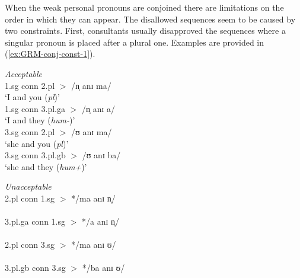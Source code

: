 

When the weak personal pronouns are conjoined there are limitations on the order
in which they can appear. The disallowed sequences seem to be caused by two
constraints. First, consultants usually disapproved   the sequences where a
singular pronoun is placed after a plural one. Examples are provided in
(\ref{ex:GRM-conj-const-1}).




 \begin{minipage}[h]{12cm}
\begin{exe}
\ex\label{ex:GRM-conj-const-1}
\begin{xlist}

\begin{multicols}{2}

\ex\label{ex:GRM-conj-const-1-g}{\it Acceptable}\\
1.sg {\sc conn} 2.pl $>$ /n̩ anɪ ma/ \\
`I and you ({\it pl})'\\
1.sg {\sc conn} 3.pl.{\sc g}a  $>$   /n̩ anɪ a/ \\
`I and they ({\it hum-})'\\
3.sg  {\sc conn} 2.pl $>$ /ʊ anɪ ma/ \\
 `she and you ({\it pl})'\\
3.sg {\sc conn} 3.pl.{\sc g}b $>$   /ʊ anɪ ba/\\
`she and they ({\it hum+})'


\ex\label{ex:GRM-conj-const-1-ng}{\it Unacceptable}\\
2.pl {\sc conn} 1.sg  $>$ */ma  anɪ n̩/\\
\\
3.pl.{\sc g}a   {\sc conn} 1.sg  $>$  */a anɪ n̩/\\
\\
2.pl  {\sc conn} 3.sg $>$ */ma anɪ ʊ/\\
\\ 
3.pl.{\sc g}b  {\sc conn} 3.sg $>$ */ba anɪ ʊ/\\
\\
\end{multicols}
\end{xlist}
\end{exe}
 \end{minipage}
\vspace*{15pt}


